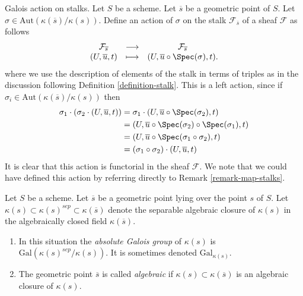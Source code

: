 \medskip\noindent
Galois action on stalks.
Let $S$ be a scheme.
Let $\overline{s}$ be a geometric point of $S$.
Let $\sigma \in \text{Aut}(\kappa(\overline{s})/\kappa(s))$.
Define an action of $\sigma$ on the stalk $\mathcal{F}_{\overline{s}}$
of a sheaf $\mathcal{F}$ as follows
\begin{equation}
\label{equation-galois-action}
\begin{matrix}
\mathcal{F}_{\overline{s}} &
\longrightarrow &
\mathcal{F}_{\overline{s}} \\
(U, \overline{u}, t) &
\longmapsto &
(U, \overline{u} \circ \Spec(\sigma), t).
\end{matrix}
\end{equation}
where we use the description of elements of the stalk in terms of triples
as in the discussion following
Definition \ref{definition-stalk}.
This is a left action, since if
$\sigma_i \in \text{Aut}(\kappa(\overline{s})/\kappa(s))$
then
\begin{align*}
\sigma_1 \cdot (\sigma_2 \cdot (U, \overline{u}, t))
& =
\sigma_1 \cdot (U, \overline{u} \circ \Spec(\sigma_2), t) \\
& =
(U, \overline{u} \circ \Spec(\sigma_2) \circ \Spec(\sigma_1), t) \\
& =
(U, \overline{u} \circ \Spec(\sigma_1 \circ \sigma_2), t) \\
& =
(\sigma_1 \circ \sigma_2) \cdot (U, \overline{u}, t)
\end{align*}
It is clear that this action is functorial in the sheaf $\mathcal{F}$.
We note that we could have defined this action by referring directly to
Remark \ref{remark-map-stalks}.

\begin{definition}
\label{definition-algebraic-geometric-point}
Let $S$ be a scheme.
Let $\overline{s}$ be a geometric point lying over the point $s$ of $S$.
Let $\kappa(s) \subset \kappa(s)^{sep} \subset \kappa(\overline{s})$
denote the separable algebraic closure of $\kappa(s)$ in the algebraically
closed field $\kappa(\overline{s})$.
\begin{enumerate}
\item In this situation the {\it absolute Galois group} of $\kappa(s)$
is $\text{Gal}(\kappa(s)^{sep}/\kappa(s))$. It is sometimes denoted
$\text{Gal}_{\kappa(s)}$.
\item The geometric point $\overline{s}$ is called
{\it algebraic} if $\kappa(s) \subset \kappa(\overline{s})$ is
an algebraic closure of $\kappa(s)$.
\end{enumerate}
\end{definition}

